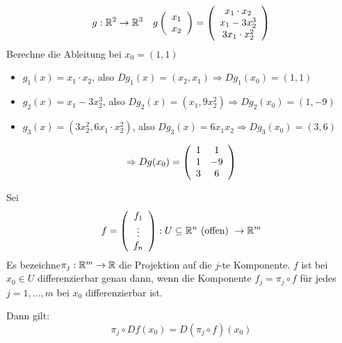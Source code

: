 \documentclass[main.tex]{subfiles}
\begin{document}
\begin{Beispiel}[$f:\R^2\to\R^3$]
  $$g:\mathbb{R}^2 \to \mathbb{R}^3 \quad g\left(\begin{array}{c}
    x_1 \\ x_2
  \end{array}\right) = \left(\begin{array}{c}
    x_1 \cdot x_2 \\
    x_1 - 3x_2^3 \\
    3 x_1 \cdot x_2^2
  \end{array}\right)$$
  Berechne die Ableitung bei $x_0 = (1,1)$
  \begin{itemize}
    \item $g_1(x) = x_1 \cdot x_2$, also $Dg_1(x) = (x_2, x_1) \Rightarrow Dg_1(x_0) = (1,1)$
    \item $g_2(x) = x_1 - 3x_2^3$, also $Dg_2(x) = (x_1, 9x_2^2) \Rightarrow Dg_2(x_0) = (1,-9)$
    \item $g_3(x) = (3 x_2^2, 6 x_1 \cdot x_2^2)$, also $Dg_3(x) = 6x_1 x_2 \Rightarrow Dg_3(x_0) = (3,6)$
  \end{itemize}
  $$\Rightarrow Dg(x_0) = \left(\begin{array}{c c}
    1 & 1 \\
    1 & -9 \\
    3 & 6
  \end{array}\right)$$
\end{Beispiel}

\begin{Lemma}
  Sei
  $$f= \left(\begin{array}{c} f_1\\ \vdots \\f_n \end{array}\right): U \subseteq \mathbb{R}^n \text{ (offen) }\to \mathbb{R}^m$$
  Es bezeichne$\pi_j: \mathbb{R}^m \to \mathbb{R}$ die Projektion auf die $j$-te Komponente.
  $f$ ist bei $x_0 \in U$ differenzierbar genau dann, wenn die Komponente $f_j = \pi_j \circ f$ für jedes $j = 1, ..., m$ bei $x_0$ differenzierbar ist.

  Dann gilt:
  $$\pi_j \circ Df(x_0) = D (\pi_j \circ f) (x_0)$$
\end{Lemma}
\end{document}
